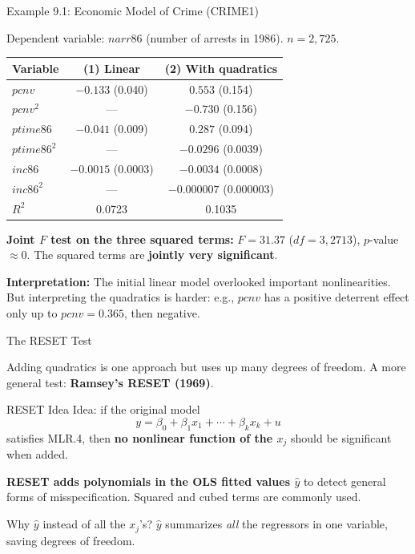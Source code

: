 \documentclass[aspectratio=169, 12pt]{beamer}
\begin{document}
\begin{frame}[shrink=10]{Example 9.1: Economic Model of Crime (CRIME1)}

  Dependent variable: $\mathit{narr86}$ (number of arrests in 1986). $n = 2{,}725$.

  \begin{center}\footnotesize
  \begin{tabular}{l|cc}
  \hline
  Variable & (1) Linear & (2) With quadratics \\
  \hline
  $\mathit{pcnv}$ & $-0.133$ (0.040) & $0.553$ (0.154) \\
  $pcnv^2$ & --- & $-0.730$ (0.156) \\
  $\mathit{ptime86}$ & $-0.041$ (0.009) & $0.287$ (0.094) \\
  $ptime86^2$ & --- & $-0.0296$ (0.0039) \\
  $\mathit{inc86}$ & $-0.0015$ (0.0003) & $-0.0034$ (0.0008) \\
  $inc86^2$ & --- & $-0.000007$ (0.000003) \\
  \hline
  $R^2$ & 0.0723 & 0.1035 \\
  \hline
  \end{tabular}
  \end{center}

  \textbf{Joint $F$ test on the three squared terms:} $F = 31.37$ ($df = 3, 2713$),
  $p$-value $\approx 0$. The squared terms are \textbf{jointly very significant}.

  \begin{keybox}
    \textbf{Interpretation:} The initial linear model overlooked important nonlinearities.
    But interpreting the quadratics is harder: e.g., $\mathit{pcnv}$ has a positive deterrent
    effect only up to $pcnv = 0.365$, then negative.
  \end{keybox}

\end{frame}

\begin{frame}[shrink=10]{The RESET Test}

  Adding quadratics is one approach but uses up many degrees of freedom.
  A more general test: \textbf{Ramsey's RESET (1969)}.

  \begin{definitionbox}{RESET Idea}
    Idea: if the original model
    \[
      y = \beta_0 + \beta_1 x_1 + \cdots + \beta_k x_k + u
    \]
    satisfies MLR.4, then \textbf{no nonlinear function of the $x_j$} should be significant
    when added.

    \medskip
    \textbf{RESET adds polynomials in the OLS fitted values $\hat{y}$} to detect general
    forms of misspecification. Squared and cubed terms are commonly used.
  \end{definitionbox}

  Why $\hat{y}$ instead of all the $x_j$'s? $\hat{y}$ summarizes \emph{all} the regressors
  in one variable, saving degrees of freedom.

\end{frame}
\end{document}
